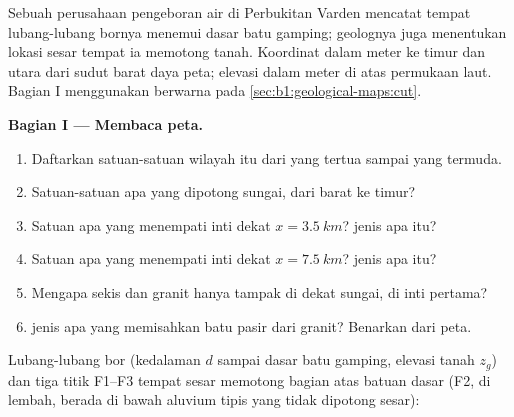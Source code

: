 \begin{problem}
\label{pb:b1:geological-maps:1}
Sebuah perusahaan pengeboran air di Perbukitan Varden mencatat tempat lubang-lubang bornya menemui dasar batu gamping; geolognya juga menentukan lokasi sesar tempat ia memotong tanah. Koordinat dalam meter ke timur dan utara dari sudut barat daya peta; elevasi dalam meter di atas permukaan laut. Bagian I menggunakan  berwarna pada \cref{sec:b1:geological-maps:cut}.

\medskip
\noindent\textbf{Bagian I --- Membaca peta.}
\begin{enumerate}
  \item Daftarkan satuan-satuan wilayah itu dari yang tertua sampai yang termuda.
  \item Satuan-satuan apa yang dipotong sungai, dari barat ke timur?
  \item Satuan apa yang menempati inti  dekat $x = \qty{3.5}{km}$?  jenis apa itu?
  \item Satuan apa yang menempati inti  dekat $x = \qty{7.5}{km}$?  jenis apa itu?
  \item Mengapa sekis dan granit hanya tampak di dekat sungai, di inti  pertama?
  \item {} jenis apa yang memisahkan batu pasir dari granit? Benarkan dari peta.
\end{enumerate}

\medskip
\noindent Lubang-lubang bor (kedalaman $d$ sampai dasar batu gamping, elevasi tanah $z_g$) dan tiga titik F1--F3 tempat sesar memotong bagian atas batuan dasar (F2, di lembah, berada di bawah aluvium tipis yang tidak dipotong sesar):


\end{problem}
